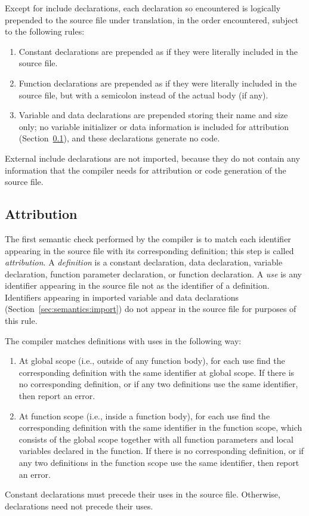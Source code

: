 \documentclass[10pt]{article}
\begin{document}
Except for include declarations, each declaration so encountered is
logically prepended to the source file under translation, in the order
encountered, subject to the following rules:
%
\begin{enumerate}
%
\item Constant declarations are prepended as if they were
  literally included in the source file.
%
\item Function declarations are prepended as if they were literally
  included in the source file, but with a semicolon instead of the
  actual body (if any).
%
\item Variable and data declarations are prepended storing their name
  and size only; no variable initializer or data information is
  included for attribution (Section~\ref{sec:semantics:attr}), and
  these declarations generate no code.
%
\end{enumerate}
%
External include declarations are not imported, because they do not
contain any information that the compiler needs for attribution or
code generation of the source file.

\subsection{Attribution}
\label{sec:semantics:attr}

The first semantic check performed by the compiler is to match each
identifier appearing in the source file with its corresponding
definition; this step is called \emph{attribution}.  A
\emph{definition} is a constant declaration, data declaration,
variable declaration, function parameter declaration, or function
declaration.  A \emph{use} is any identifier appearing in the source
file not as the identifier of a definition. Identifiers appearing in
imported variable and data declarations
(Section~\ref{sec:semantics:import}) do not appear in the source file
for purposes of this rule.

The compiler matches definitions with uses in the following way:
%
\begin{enumerate}
%
\item At global scope (i.e., outside of any function body), for each
  use find the corresponding definition with the same identifier at
  global scope.  If there is no corresponding definition, or if any
  two definitions use the same identifier, then  report an error.
%
\item At function scope (i.e., inside a function body), for each use
  find the corresponding definition with the same identifier in the
  function scope, which consists of the global scope together with all
  function parameters and local variables declared in the function.
  If there is no corresponding definition, or if any two definitions
  in the function scope use the same identifier, then report an error.
%
\end{enumerate}
% 
Constant declarations must precede their uses in the source file.
Otherwise, declarations need not precede their uses.
\end{document}
